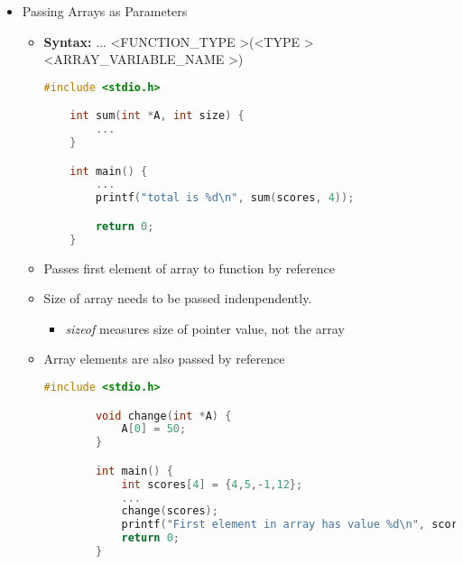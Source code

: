 \documentclass[12pt]{article}
\begin{document}
\begin{itemize}
    \item Passing Arrays as Parameters
    \begin{itemize}
        \item \textbf{Syntax:} ... \textless FUNCTION\_TYPE \textgreater(\textless TYPE \textgreater *\textless ARRAY\_VARIABLE\_NAME \textgreater)

    \begin{lstlisting}[language=c]
    #include <stdio.h>

    int sum(int *A, int size) {
        ...
    }

    int main() {
        ...
        printf("total is %d\n", sum(scores, 4));

        return 0;
    }
    \end{lstlisting}
        \item Passes first element of array to function by reference
        \item Size of array needs to be passed indenpendently.
        \begin{itemize}
            \item \textit{sizeof} measures size of pointer value, not the array
        \end{itemize}
        \item Array elements are also passed by reference

        \begin{lstlisting}[language=c]
        #include <stdio.h>

        void change(int *A) {
            A[0] = 50;
        }

        int main() {
            int scores[4] = {4,5,-1,12};
            ...
            change(scores);
            printf("First element in array has value %d\n", scores[0]); // <- returns 50, instead of 4
            return 0;
        }
        \end{lstlisting}
    \end{itemize}
\end{itemize}
\end{document}

